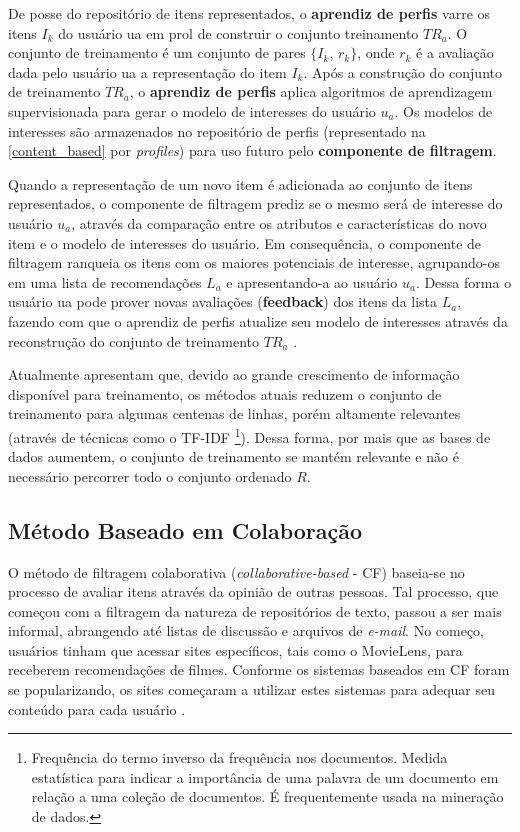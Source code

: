 \documentclass[12pt, openright, oneside, a4paper, brazil]{abntex2}
\begin{document}
De posse do repositório de itens representados, o \textbf{aprendiz de perfis} varre os itens $I_{k}$ do usuário ua em prol de construir o conjunto treinamento $TR_{a}$. O conjunto de treinamento é um conjunto de pares $\lbrace I_{k}$, $r_{k} \rbrace$, onde $r_{k}$ é a avaliação dada pelo usuário ua a representação do item $I_{k}$. Após a construção do conjunto de treinamento $TR_{a}$, o \textbf{aprendiz de perfis} aplica algoritmos de aprendizagem supervisionada para gerar o modelo de interesses do usuário $u_{a}$. Os modelos de interesses são armazenados no repositório de perfis (representado na \autoref{content_based} por \textit{profiles}) para uso futuro pelo \textbf{componente de filtragem}.

Quando a representação de um novo item é adicionada ao conjunto de itens representados, o componente de filtragem prediz se o mesmo será de interesse do usuário $u_{a}$, através da comparação entre os atributos e características do novo item e o modelo de interesses do usuário. Em consequência, o componente de filtragem ranqueia os itens com os maiores potenciais de interesse, agrupando-os em uma lista de recomendações $L_{a}$ e apresentando-a ao usuário $u_{a}$. Dessa forma o usuário ua pode prover novas avaliações (\textbf{feedback}) dos itens da lista $L_{a}$, fazendo com que o aprendiz de perfis atualize seu modelo de interesses através da reconstrução do conjunto de treinamento $TR_{a}$ \cite{lops2011content}.

Atualmente  apresentam que, devido ao grande crescimento de informação disponível para treinamento, os métodos atuais reduzem o conjunto de treinamento para algumas centenas de linhas, porém altamente relevantes (através de técnicas como o TF-IDF \footnote{Frequência do termo inverso da frequência nos documentos. Medida estatística para indicar a importância de uma palavra de um documento em relação a uma coleção de documentos. É frequentemente usada na mineração de dados.}). Dessa forma, por mais que as bases de dados aumentem, o conjunto de treinamento se mantém relevante e não é necessário percorrer todo o conjunto ordenado $R$.

\subsection{Método Baseado em Colaboração}

O método de filtragem colaborativa (\textit{collaborative-based} - CF) baseia-se no processo de avaliar itens através da opinião de outras pessoas. Tal processo, que começou com a filtragem da natureza de repositórios de texto, passou a ser mais informal, abrangendo até listas de discussão e arquivos de \textit{e-mail}. No começo, usuários tinham que acessar sites específicos, tais como o MovieLens, para receberem recomendações de filmes. Conforme os sistemas baseados em CF foram se popularizando, os sites começaram a utilizar estes sistemas para adequar seu conteúdo para cada usuário \cite{schafer2007collaborative}.
\end{document}
